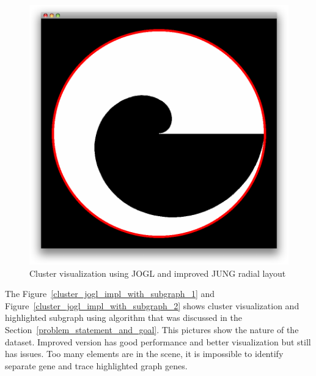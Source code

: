 \documentclass[a4paper,oneside]{article}
\begin{document}
\begin{figure}
\begin{center}
	\includegraphics[scale=0.3]{pictures/cluster_jogl_impl.png}
	\caption{Cluster visualization using JOGL and improved JUNG radial layout}
	\label{cluster_jogl_impl}
\end{center}
\end{figure}


The Figure~\ref{cluster_jogl_impl_with_subgraph_1} and Figure~\ref{cluster_jogl_impl_with_subgraph_2} shows cluster visualization and highlighted subgraph using algorithm that was discussed in the Section~\ref{problem_statement_and_goal}. This pictures show the nature of the dataset. Improved version has good performance and better visualization but still has issues. Too many elements are in the scene, it is impossible to identify separate gene and trace highlighted graph genes.
\end{document}
